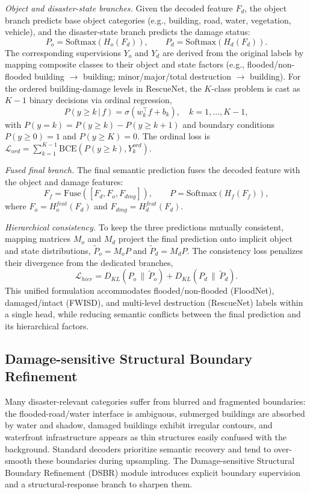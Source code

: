 \documentclass[lettersize,journal]{IEEEtran}
\begin{document}
\textit{Object and disaster-state branches.} Given the decoded feature $F_d$, the object branch predicts base object categories (e.g., building, road, water, vegetation, vehicle), and the disaster-state branch predicts the damage status:
\begin{equation}
P_o = \mathrm{Softmax}(H_o(F_d)),\qquad P_d = \mathrm{Softmax}(H_d(F_d)).
\end{equation}
The corresponding supervisions $Y_o$ and $Y_d$ are derived from the original labels by mapping composite classes to their object and state factors (e.g., flooded/non-flooded building $\rightarrow$ building; minor/major/total destruction $\rightarrow$ building). For the ordered building-damage levels in RescueNet, the $K$-class problem is cast as $K-1$ binary decisions via ordinal regression,
\begin{equation}
P(y\geq k\,|\,f) = \sigma(w_k^{\top}f + b_k),\quad k=1,\dots,K-1,
\end{equation}
with $P(y=k)=P(y\geq k)-P(y\geq k+1)$ and boundary conditions $P(y\geq 0)=1$ and $P(y\geq K)=0$. The ordinal loss is $\mathcal{L}_{ord}=\sum_{k=1}^{K-1}\mathrm{BCE}(P(y\geq k),Y_k^{ord})$.

\textit{Fused final branch.} The final semantic prediction fuses the decoded feature with the object and damage features:
\begin{equation}
F_f = \mathrm{Fuse}([F_d, F_o, F_{dmg}]),\qquad P = \mathrm{Softmax}(H_f(F_f)),
\end{equation}
where $F_o=H_o^{feat}(F_d)$ and $F_{dmg}=H_d^{feat}(F_d)$.

\textit{Hierarchical consistency.} To keep the three predictions mutually consistent, mapping matrices $M_o$ and $M_d$ project the final prediction onto implicit object and state distributions, $\tilde{P}_o=M_oP$ and $\tilde{P}_d=M_dP$. The consistency loss penalizes their divergence from the dedicated branches,
\begin{equation}
\mathcal{L}_{hier} = D_{KL}(P_o\,\|\,\tilde{P}_o) + D_{KL}(P_d\,\|\,\tilde{P}_d).
\end{equation}
This unified formulation accommodates flooded/non-flooded (FloodNet), damaged/intact (FWISD), and multi-level destruction (RescueNet) labels within a single head, while reducing semantic conflicts between the final prediction and its hierarchical factors.

\subsection{Damage-sensitive Structural Boundary Refinement}
Many disaster-relevant categories suffer from blurred and fragmented boundaries: the flooded-road/water interface is ambiguous, submerged buildings are absorbed by water and shadow, damaged buildings exhibit irregular contours, and waterfront infrastructure appears as thin structures easily confused with the background. Standard decoders prioritize semantic recovery and tend to over-smooth these boundaries during upsampling. The Damage-sensitive Structural Boundary Refinement (DSBR) module introduces explicit boundary supervision and a structural-response branch to sharpen them.
\end{document}
